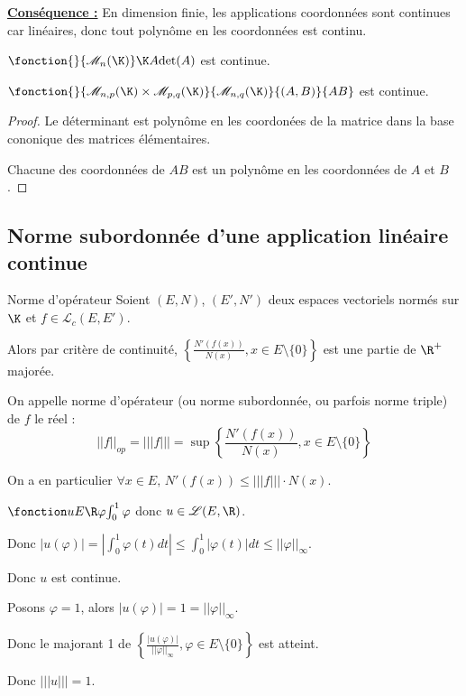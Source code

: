 \textbf{\uline{Conséquence :}} 
En dimension finie, les applications coordonnées sont continues car linéaires, donc 
tout polynôme en les coordonnées est continu. 


\avspace $\fonction{}{\mathscr M_n(\K)} \K A {\det(A)}$ est continue.

$\fonction {}{\mathscr M_{n, p}(\K) \times \mathscr M_{p, q}(\K)}{\mathscr M_{n, q}(\K)}{(A, B)}{AB}$ est continue.

\begin{proof}
    Le déterminant est polynôme en les coordonées de la matrice dans la base cononique des 
    matrices élémentaires. 

    \svspace Chacune des coordonnées de $AB$ est un polynôme en les coordonnées de $A$ et $B$.
\end{proof}


\subsection{Norme subordonnée d'une application linéaire continue}

\begin{definition}{Norme d'opérateur}{}
    Soient $(E, N)$, $(E', N')$ deux espaces vectoriels normés sur $\K$ et $f \in \mathscr L_c(E, E')$.

    Alors par critère de continuité, $\left\{ \frac{N'(f(x))}{N(x)}, x \in E \setminus \{0\} \right\}$ est
    une partie de $\R^+$ majorée. 

    On appelle norme d'opérateur (ou norme subordonnée, ou parfois norme triple) de $f$ le réel : 
    $$||f||_{op} = |||f||| = \sup \left\{ \frac{N'(f(x))}{N(x)}, x \in E \setminus \{0\} \right\} $$ 


    On a en particulier $\forall x \in E, \, N'(f(x)) \leqslant |||f||| \cdot N(x)$.
\end{definition}


\begin{exemple}
    $\fonction u E \R \varphi {\int_0^1 \varphi}$ donc $u \in \mathscr L(E, \R)$. 

    Donc $|u(\varphi)| = \left| \int_0^1 \varphi(t) dt \right| \leqslant \int_0^1 |\varphi(t)| dt \leqslant ||\varphi||_\infty$.

    Donc $u$ est continue. 

    Posons $\varphi = 1$, alors $|u(\varphi)| = 1 = ||\varphi||_\infty$.

    Donc le majorant 1 de $\left\{ \frac{|u(\varphi)|}{||\varphi||_\infty}, \varphi \in E \setminus \{0\} \right\}$ est atteint. 

    Donc $|||u||| = 1$.
\end{exemple}


